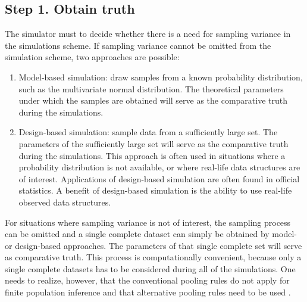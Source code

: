 \documentclass[bimj,fleqn]{w-art}
\theoremstyle{plain}
\theoremstyle{definition}
\begin{document}

\subsection{Step 1. Obtain truth}


The simulator must to decide whether there is a need for sampling variance in the simulations scheme. If sampling variance cannot be omitted from the simulation scheme, two approaches are possible:
\begin{enumerate}
  \item Model-based simulation: draw samples from a known probability distribution, such as the multivariate normal distribution. The theoretical parameters under which the samples are obtained will serve as the comparative truth during the simulations. 
  \item Design-based simulation: sample data from a sufficiently large set. The parameters of the sufficiently large set will serve as the comparative truth during the simulations. This approach is often used in situations where a probability distribution is not available, or where real-life data structures are of interest. Applications of design-based simulation are often found in official statistics. A benefit of design-based simulation is the ability to use real-life observed data structures. 
\end{enumerate}
For situations where sampling variance is not of interest, the sampling process can be omitted and a single complete dataset can simply be obtained by model- or design-based approaches. The parameters of that single complete set will serve as comparative truth. This process is computationally convenient, because only a single complete datasets has to be considered during all of the simulations. One needs to realize, however, that the conventional pooling rules \citep[cf.][p. 76-77]{rubi87} do not apply for finite population inference and that alternative pooling rules need to be used \citep{raghunathan2003multiple,vink14}. 

\end{document}
